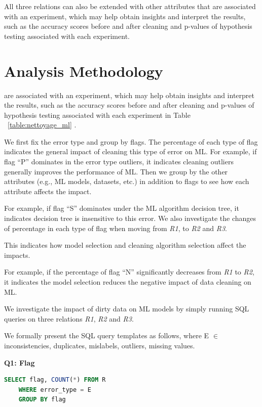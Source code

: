 All three relations can also be extended with other attributes that are associated with an experiment, which may help obtain insights
and interpret the results, such as the accuracy scores before and
after cleaning and p-values of hypothesis testing associated with
each experiment.


\section{Analysis Methodology}

are associated with an experiment, which may help obtain insights
and interpret the results, such as the accuracy scores before and
after cleaning and p-values of hypothesis testing associated with
each experiment in Table  ~\ref{table:nettoyage_ml} . 

We first fix the error type and group by flags. The percentage of each type of flag indicates the general impact of cleaning this type of error on ML. For example,
if flag “P” dominates in the error type outliers, it indicates cleaning outliers generally improves the performance of ML. Then we
group by the other attributes (e.g., ML models, datasets, etc.) in addition to flags to see how each attribute affects the impact. 

For example, if flag “S” dominates under the ML algorithm decision tree, it indicates decision tree is insensitive to this error.
We also investigate the changes of percentage in each type of flag when moving from \textit{R1}, to \textit{R2} and \textit{R3}. 

This indicates how model selection and cleaning algorithm selection affect the impacts. 

For example, if the percentage of flag “N” significantly decreases from
\textit{R1} to \textit{R2}, it indicates the model selection reduces the negative impact of data cleaning on ML.

We investigate the impact of dirty data on ML models by simply running SQL queries on three relations \textit{R1}, \textit{R2} and \textit{R3}. 

We formally present the SQL query templates as follows, where E $\in$ {inconsistencies, duplicates, mislabels, outliers, missing values}.

\textbf{Q1: Flag}
\begin{lstlisting}[language=SQL, caption=Q1: Flag]
	SELECT flag, COUNT(*) FROM R 
	WHERE error_type = E 
	GROUP BY flag
\end{lstlisting}

